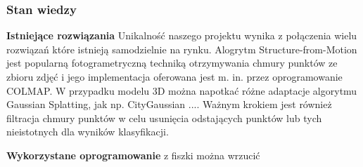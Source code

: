 \subsubsection{Stan wiedzy}

\textbf{Istniejące rozwiązania}
\vspace{0.5cm}
Unikalność naszego projektu wynika z połączenia wielu rozwiązań które istnieją samodzielnie na rynku. Alogrytm Structure-from-Motion jest popularną fotogrametryczną techniką otrzymywania chmury punktów ze zbioru zdjęć i jego implementacja oferowana jest m. in. przez oprogramowanie COLMAP. W przypadku modelu 3D można napotkać różne adaptacje algorytmu Gaussian Splatting, jak np. CityGaussian .... Ważnym krokiem jest również filtracja chmury punktów w celu usunięcia odstających punktów lub tych nieistotnych dla wyników klasyfikacji.  

\textbf{Wykorzystane oprogramowanie}
z fiszki można wrzucić 